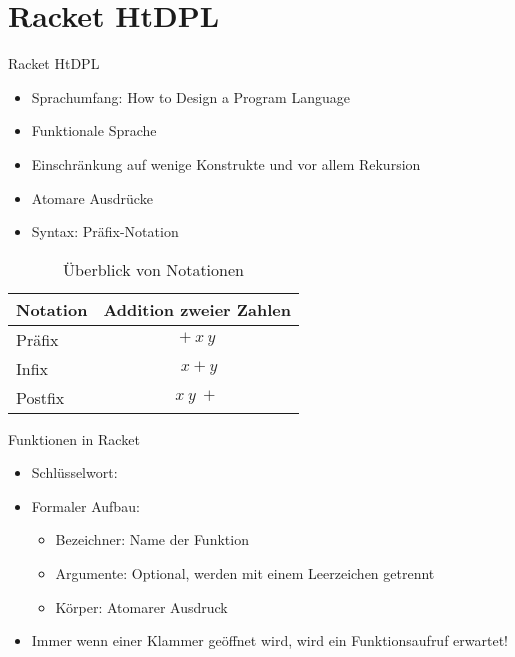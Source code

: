 \documentclass{../tuda-beamer}
\begin{document}
  \section{Racket HtDPL}
  \begin{frame}{Racket HtDPL}
    \begin{itemize}
      \item Sprachumfang: How to Design a Program Language
      \item Funktionale Sprache
      \item Einschränkung auf wenige Konstrukte und vor allem Rekursion
      \item Atomare Ausdrücke
      \item Syntax: Präfix-Notation
    \end{itemize}

    \begin{table}[h]
      \centering
      \begin{tabular}{lc}
        \toprule
        \textbf{Notation} & \textbf{Addition zweier Zahlen}
        \\
        \midrule
        Präfix & \(+ \ x \ y\)
        \\
        Infix & \(\ x + y\)
        \\
        Postfix & \(x \ y \ +\)
        \\
        \bottomrule
      \end{tabular}
      \caption{Überblick von Notationen}
    \end{table}
  \end{frame}

  \begin{frame}{Funktionen in Racket}
    \begin{itemize}
      \item Schlüsselwort: 
      \item Formaler Aufbau:
      \begin{center}
      \end{center}
      \begin{itemize}
        \item Bezeichner: Name der Funktion
        \item Argumente: Optional, werden mit einem Leerzeichen getrennt
        \item Körper: Atomarer Ausdruck
      \end{itemize}
      \item Immer wenn einer Klammer geöffnet wird, wird ein Funktionsaufruf erwartet!
    \end{itemize}
  \end{frame}
\end{document}
